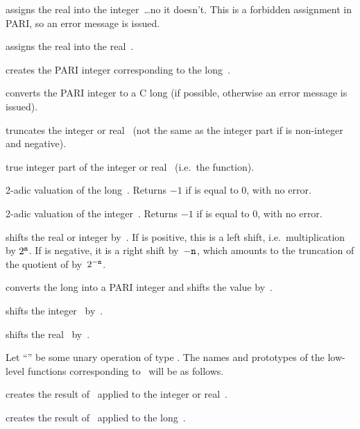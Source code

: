  assigns the real  into the
integer~\dots no it doesn't. This is a forbidden assignment in PARI,
so an error message is issued.

 assigns the real  into the real~.
\smallskip

 creates the PARI integer corresponding to the
long~.

 converts the PARI integer  to a C long (if
possible, otherwise an error message is issued).
\smallskip

 truncates the integer or real~
(not the same as the integer part if  is non-integer and negative).

 true integer part of the integer or
real~ (i.e.~the  function).


 2-adic valuation of the long~. Returns $-1$
if  is equal to 0, with no error.

 2-adic valuation of the integer~. Returns $-1$
if  is equal to 0, with no error.

 shifts the real or
integer  by~. If  is positive, this is a left shift,
i.e.~multiplication by $2^{{\tt n}}$. If  is negative, it is a right
shift by~$-{\tt n}$, which amounts to the truncation of the quotient of 
by~$2^{-{\tt n}}$.

 converts the long  into a PARI
integer and shifts the value by~.

 shifts the integer~ by~.

 shifts the real~ by~.


\noindent
Let ``\op'' be some unary operation of type . The names and
prototypes of the low-level functions corresponding to \op\ will be as follows.

 creates the result of \op\ applied to the integer
or real~.

 creates the result of \op\ applied to the
long~.

